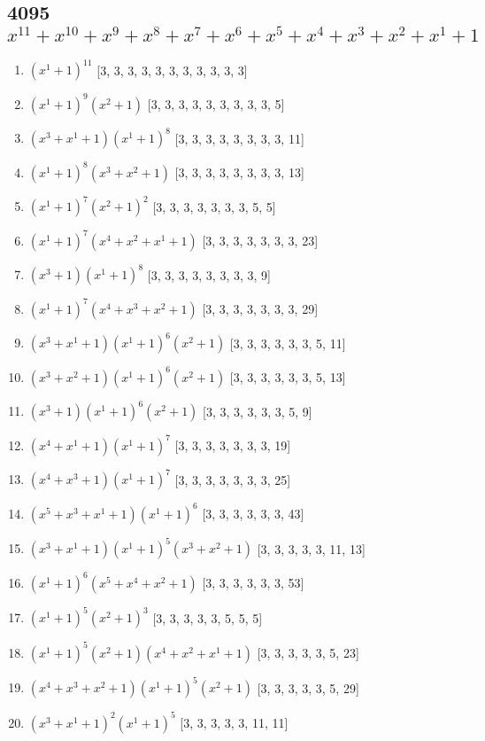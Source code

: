 \documentclass[10pt,twocolumn]{article}
\begin{document}
\subsection*{4095$x^{11} + x^{10} + x^{9} + x^{8} + x^{7} + x^{6} + x^{5} + x^{4} + x^{3} + x^{2} + x^{1} + 1$  } 
\begin{enumerate}
\item $(x^{1} + 1)^{11}$  [3, 3, 3, 3, 3, 3, 3, 3, 3, 3, 3]
\item $(x^{1} + 1)^{9}(x^{2} + 1)$  [3, 3, 3, 3, 3, 3, 3, 3, 3, 5]
\item $(x^{3} + x^{1} + 1)(x^{1} + 1)^{8}$  [3, 3, 3, 3, 3, 3, 3, 3, 11]
\item $(x^{1} + 1)^{8}(x^{3} + x^{2} + 1)$  [3, 3, 3, 3, 3, 3, 3, 3, 13]
\item $(x^{1} + 1)^{7}(x^{2} + 1)^{2}$  [3, 3, 3, 3, 3, 3, 3, 5, 5]
\item $(x^{1} + 1)^{7}(x^{4} + x^{2} + x^{1} + 1)$  [3, 3, 3, 3, 3, 3, 3, 23]
\item $(x^{3} + 1)(x^{1} + 1)^{8}$  [3, 3, 3, 3, 3, 3, 3, 3, 9]
\item $(x^{1} + 1)^{7}(x^{4} + x^{3} + x^{2} + 1)$  [3, 3, 3, 3, 3, 3, 3, 29]
\item $(x^{3} + x^{1} + 1)(x^{1} + 1)^{6}(x^{2} + 1)$  [3, 3, 3, 3, 3, 3, 5, 11]
\item $(x^{3} + x^{2} + 1)(x^{1} + 1)^{6}(x^{2} + 1)$  [3, 3, 3, 3, 3, 3, 5, 13]
\item $(x^{3} + 1)(x^{1} + 1)^{6}(x^{2} + 1)$  [3, 3, 3, 3, 3, 3, 5, 9]
\item $(x^{4} + x^{1} + 1)(x^{1} + 1)^{7}$  [3, 3, 3, 3, 3, 3, 3, 19]
\item $(x^{4} + x^{3} + 1)(x^{1} + 1)^{7}$  [3, 3, 3, 3, 3, 3, 3, 25]
\item $(x^{5} + x^{3} + x^{1} + 1)(x^{1} + 1)^{6}$  [3, 3, 3, 3, 3, 3, 43]
\item $(x^{3} + x^{1} + 1)(x^{1} + 1)^{5}(x^{3} + x^{2} + 1)$  [3, 3, 3, 3, 3, 11, 13]
\item $(x^{1} + 1)^{6}(x^{5} + x^{4} + x^{2} + 1)$  [3, 3, 3, 3, 3, 3, 53]
\item $(x^{1} + 1)^{5}(x^{2} + 1)^{3}$  [3, 3, 3, 3, 3, 5, 5, 5]
\item $(x^{1} + 1)^{5}(x^{2} + 1)(x^{4} + x^{2} + x^{1} + 1)$  [3, 3, 3, 3, 3, 5, 23]
\item $(x^{4} + x^{3} + x^{2} + 1)(x^{1} + 1)^{5}(x^{2} + 1)$  [3, 3, 3, 3, 3, 5, 29]
\item $(x^{3} + x^{1} + 1)^{2}(x^{1} + 1)^{5}$  [3, 3, 3, 3, 3, 11, 11]

\end{enumerate}
\end{document}
